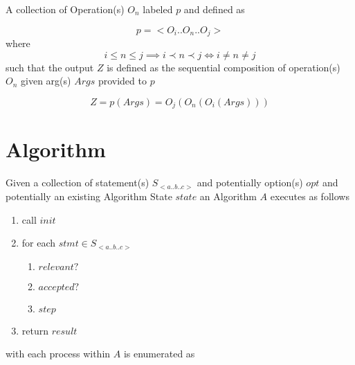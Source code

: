 \documentclass[../main.tex]{subfiles}
\begin{document}
A collection of Operation(s) $O_{n}$ labeled $p$ and defined as

$$p = <O_{i}..O_{n}..O_{j}>$$
where
$$i \leq n \leq j \implies i \prec n \prec j \iff i \not= n \not= j$$
such that the output $Z$ is defined as the sequential composition of operation(s) $O_{n}$ given arg(s) $Args$ provided to $p$

$$ Z = p(Args) = O_{j}(O_{n}(O_{i}(Args))) $$

\section{Algorithm}
Given a collection of statement(s) $S_{<a..b..c>}$ and potentially option(s) $opt$ and potentially an existing Algorithm State $state$ an Algorithm $A$ executes as follows

\begin{enumerate}
\item call $init$
\item for each $stmt \in S_{<a..b..c>}$
  \begin{enumerate}
  \item $relevant?$
  \item $accepted?$
  \item $step$
  \end{enumerate}
\item return $result$
\end{enumerate}
with each process within $A$ is enumerated as
\end{document}
